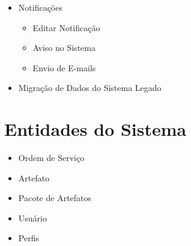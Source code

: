 \begin{itemize}
	
	
	\item Notificações
	\begin{itemize}
		\item Editar Notificação
		\item Aviso no Sistema
		\item Envio de E-mails
	\end{itemize}	
	
	\item Migração de Dados do Sistema Legado	
	
	
\end{itemize}



\chapter{Entidades do Sistema}


\begin{itemize}
	\item Ordem de Serviço
	\item Artefato
	\item Pacote de Artefatos
	\item Usuário
	\item Perfis
\end{itemize}



